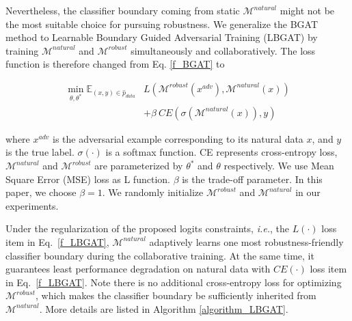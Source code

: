 \documentclass[10pt,twocolumn,letterpaper]{article}
\begin{document}
Nevertheless, the classifier boundary coming from static $\mathcal{M}^{natural}$ might not be the most suitable choice for pursuing robustness.
We generalize the BGAT method to Learnable Boundary Guided Adversarial Training (LBGAT) by training $\mathcal{M}^{natural}$ and $\mathcal{M}^{robust}$ simultaneously and collaboratively. The loss function is therefore changed from Eq. \eqref{f_BGAT} to
\begin{small}
	\begin{align}
	\mathop{\min}_{\theta,\theta^{*}} \mathbb{E}_{(x,y) \in \hat{p}_{data}} &L\left(\mathcal{M}^{robust}(x^{adv}), \mathcal{M}^{natural}(x)\right) \nonumber \\
	& + \beta ~ CE\left(\sigma(\mathcal{M}^{natural}(x)),y\right) \label{f_LBGAT}
	\end{align}
\end{small}
where $x^{adv}$ is the adversarial example corresponding to its natural data $x$, and $y$ is the true label. $\sigma(\cdot)$ is a softmax function. CE represents cross-entropy loss, $\mathcal{M}^{natural}$ and $\mathcal{M}^{robust}$ are parameterized by $\theta^{*}$ and $\theta$ respectively. We use Mean Square Error (MSE) loss as L function. $\beta$ is the trade-off parameter. In this paper, we choose $\beta=1$. We randomly initialize $\mathcal{M}^{robust}$ and $\mathcal{M}^{natural}$ in our experiments.

Under the regularization of the proposed logits constraints, {\it i.e.}, the $L(\cdot)$ loss item in Eq.~\eqref{f_LBGAT}, $\mathcal{M}^{natural}$ adaptively learns one most robustness-friendly classifier boundary during the collaborative training. At the same time, it guarantees least performance degradation on natural data with $CE(\cdot)$ loss item in Eq.~\eqref{f_LBGAT}. Note there is no additional cross-entropy loss for optimizing $\mathcal{M}^{robust}$, which makes the classifier boundary be sufficiently inherited from $\mathcal{M}^{natural}$. More details are listed in Algorithm \ref{algorithm_LBGAT}.
\end{document}
